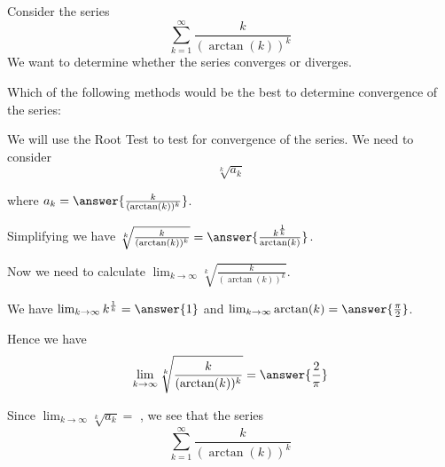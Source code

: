 \documentclass{ximera}
\author{Jason Miller}
\begin{document}
\begin{exercise}

Consider the series 
\[
\sum^{\infty}_{k=1} \frac{k}{(\arctan(k))^k}
\]
We want to determine whether the series converges or diverges. 


Which of the following methods would be the best to determine convergence of the series:

\begin{multipleChoice}
\end{multipleChoice}



\begin{exercise}

We will use the Root Test to test for convergence of the series. 
We need to consider
\[
\sqrt[k]{a_k}
\]

where $a_k=\answer{ \frac{k}{(\arctan(k))^k}}$. 

Simplifying we have $ \sqrt[k]{\frac{k}{(\arctan(k))^k}} =\answer{   \frac{k^{\frac{1}{k}}}{\arctan(k)}  }$.




\begin{exercise}

Now we need to calculate $\lim_{k\to \infty}\sqrt[k]{\frac{k}{(\arctan(k))^k}}$. 

We have $\lim_{k \to \infty} k^{\frac{1}{k}}=\answer{1}$
and 
$\lim_{k \to \infty} \arctan(k)=\answer{ \frac{\pi}{2}}$. 

Hence we have 
\[
  \lim_{k \to \infty}\sqrt[k]{\frac{k}{(\arctan(k))^k}} =\answer{ \frac{2}{\pi} }
\]

\begin{exercise}

Since $\lim_{k \to \infty} \sqrt[k]{a_k}=$  ,
we see that the series
\[
\sum^{\infty}_{k=1} \frac{k}{(\arctan(k))^k}
\]
\begin{multipleChoice}
\end{multipleChoice}


\end{exercise}

\end{exercise}
\end{exercise}
\end{exercise}
\end{document}
